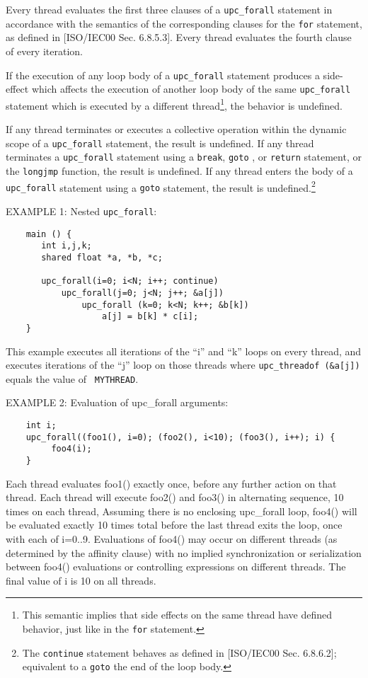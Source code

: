 \np Every thread evaluates the first three clauses of a 
    {\tt upc\_forall} statement in accordance with the semantics of
    the corresponding clauses for the {\tt for} statement, as defined in
    [ISO/IEC00 Sec. 6.8.5.3].  Every thread evaluates the fourth
    clause of every iteration.

\np If the execution of any loop body of a {\tt upc\_forall} statement
    produces a side-effect which affects the execution of another loop
    body of the same {\tt upc\_forall} statement which is executed by a different
    thread\footnote{This semantic implies that side effects on the same thread 
    have defined behavior, just like in the {\tt for} statement.}, the behavior is
    undefined.

\np If any thread terminates or executes a collective operation
   within the dynamic scope of a {\tt upc\_forall}
   statement, the result is undefined. If any thread terminates
   a  {\tt upc\_forall}  statement using a {\tt break},
   {\tt goto} , or {\tt return} statement, or the {\tt longjmp} function,
   the result is undefined.
   If any thread enters the body of a {\tt upc\_forall} statement
   using a {\tt goto} statement, the result is undefined.\footnote{The
   {\tt continue} statement behaves as defined in [ISO/IEC00 Sec. 
   6.8.6.2]; equivalent to a {\tt goto} the end of the loop body.}

\np EXAMPLE 1: Nested {\tt upc\_forall}: 

\begin{verbatim}
    main () { 
       int i,j,k; 
       shared float *a, *b, *c; 
    
       upc_forall(i=0; i<N; i++; continue) 
           upc_forall(j=0; j<N; j++; &a[j]) 
               upc_forall (k=0; k<N; k++; &b[k]) 
                   a[j] = b[k] * c[i]; 
    } 
\end{verbatim}

   This example executes all iterations of the ``i'' and ``k'' loops
   on every thread, and executes iterations of the ``j'' loop on those
   threads where {\tt upc\_threadof (\&a[j])} equals the value of {\tt
   MYTHREAD}.
   
\np EXAMPLE 2: Evaluation of upc\_forall arguments:

\begin{verbatim}
    int i;
    upc_forall((foo1(), i=0); (foo2(), i<10); (foo3(), i++); i) {
         foo4(i);
    }
\end{verbatim}
   Each thread evaluates foo1() exactly once, before any further action on that
   thread. Each thread will execute foo2() and foo3() in alternating sequence, 
   10 times on each thread,
   Assuming there is no enclosing upc\_forall loop, 
   foo4() will be evaluated exactly 10 times total before the last thread exits the 
   loop, once with each of i=0..9. Evaluations of foo4() may occur on different 
   threads (as determined by the affinity clause) with no implied synchronization 
   or serialization between foo4() evaluations or controlling expressions on 
   different threads. The final value of i is 10 on all threads.


